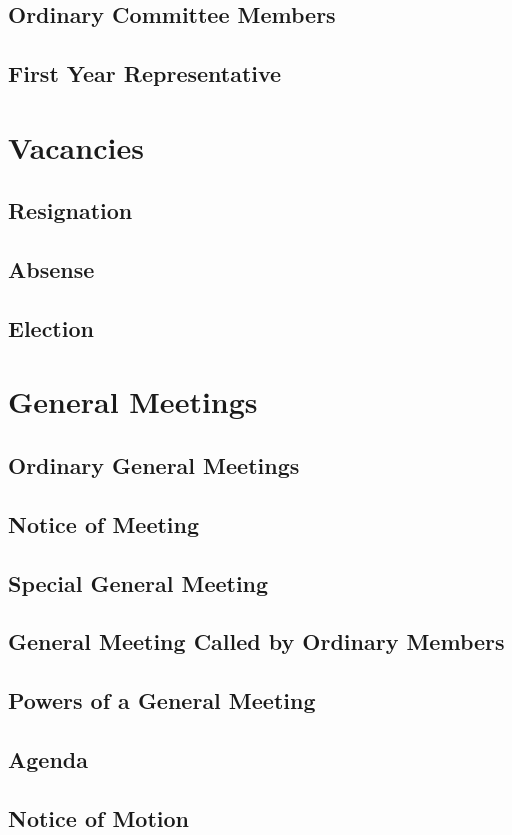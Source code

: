 \documentclass[12pt]{article} %
\begin{document}
\subsection{Ordinary Committee Members}
\subsection{First Year Representative}

\section{Vacancies}
\subsection{Resignation}
\subsection{Absense}
\subsection{Election}

\section{General Meetings}
\subsection{Ordinary General Meetings}
\subsection{Notice of Meeting}
\subsection{Special General Meeting}
\subsection{General Meeting Called by Ordinary Members}
\subsection{Powers of a General Meeting}
\subsection{Agenda}
\subsection{Notice of Motion}
\end{document}
